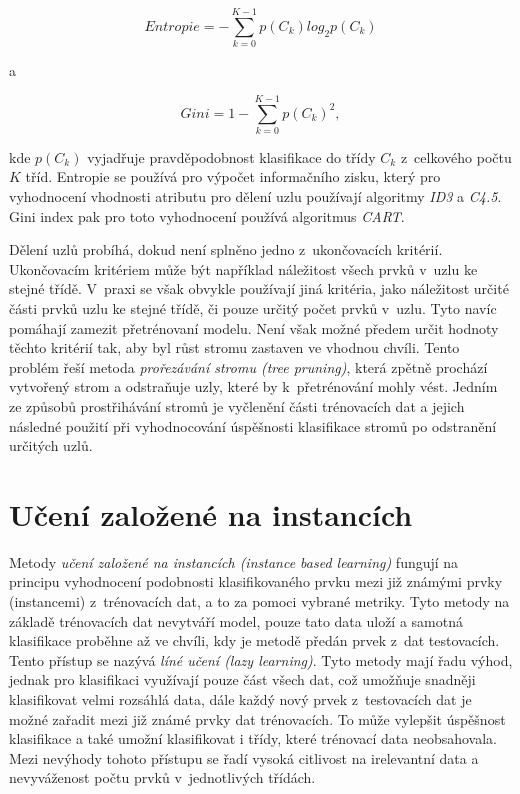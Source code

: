 \begin{equation}
    Entropie = - \sum\limits_{k=0}^{K-1} p(C_k) log_2 p(C_k)
\end{equation}

\medskip

\noindent a

\begin{equation}
    Gini = 1 - \sum\limits_{k=0}^{K-1} p(C_k)^2,
\end{equation}

\medskip

\noindent kde $p(C_k)$ vyjadřuje pravděpodobnost klasifikace do třídy $C_k$ z~celkového počtu $K$ tříd. Entropie se používá pro výpočet informačního zisku, který pro vyhodnocení vhodnosti atributu pro dělení uzlu používají algoritmy \textit{ID3} a \textit{C4.5}. Gini index pak pro toto vyhodnocení používá algoritmus \textit{CART}.

Dělení uzlů probíhá, dokud není splněno jedno z~ukončovacích kritérií. Ukončovacím kritériem může být například náležitost všech prvků v~uzlu ke stejné třídě. V~praxi se však obvykle používají jiná kritéria, jako náležitost určité části prvků uzlu ke stejné třídě, či pouze určitý počet prvků v~uzlu. Tyto navíc pomáhají zamezit přetrénovaní modelu. Není však možné předem určit hodnoty těchto kritérií tak, aby byl růst stromu zastaven ve vhodnou chvíli. Tento problém řeší metoda \textit{prořezávání stromu (tree pruning)}, která zpětně prochází vytvořený strom a odstraňuje uzly, které by k~přetrénování mohly vést. Jedním ze způsobů prostřihávání stromů je vyčlenění části trénovacích dat a jejich následné použití při vyhodnocování úspěšnosti klasifikace stromů po odstranění určitých uzlů.\cite{data_classification}\cite{understanding_machine_learning}\cite{strojove_uceni}\cite{machine_learning}

\section{Učení založené na instancích}
\label{uceni_zalozene_na_instancich}
Metody \textit{učení založené na instancích (instance based learning)} fungují na principu vyhodnocení podobnosti klasifikovaného prvku mezi již známými prvky (instancemi) z~trénovacích dat, a to za pomoci vybrané metriky. Tyto metody na základě trénovacích dat nevytváří model, pouze tato data uloží a samotná klasifikace proběhne až ve chvíli, kdy je metodě předán prvek z~dat testovacích. Tento přístup se nazývá \textit{líné učení (lazy learning)}. Tyto metody mají řadu výhod, jednak pro klasifikaci využívají pouze část všech dat, což umožňuje snadněji klasifikovat velmi rozsáhlá data, dále každý nový prvek z~testovacích dat je možné zařadit mezi již známé prvky dat trénovacích. To může vylepšit úspěšnost klasifikace a také umožní klasifikovat i třídy, které trénovací data neobsahovala. Mezi nevýhody tohoto přístupu se řadí vysoká citlivost na irelevantní data a nevyváženost počtu prvků v~jednotlivých třídách.\cite{data_classification}\cite{machine_learning}\cite{strojove_uceni}

